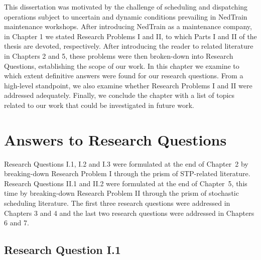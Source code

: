 	This dissertation was motivated by the challenge of scheduling and dispatching operations 
	subject to uncertain and dynamic conditions prevailing in NedTrain maintenance workshops.
	After introducing NedTrain as a maintenance company, 
	in Chapter 1 we stated Research Problems I and II, to which Parts I and II of the thesis are devoted, respectively. 
	After introducing the reader to related literature in Chapters 2 and 5, 
	these problems were then broken-down into Research Questions, 
	establishing the scope of our work. 
	In this chapter we examine to which extent definitive answers were found for our research questions. 
	From a high-level standpoint, we also examine whether Research Problems I and II were addressed adequately. 
	Finally, we conclude the chapter with a list of topics related to our work that could be investigated in future work.

\section{Answers to Research Questions}
	
	Research Questions I.1, I.2 and I.3 were formulated at the end of Chapter~2 
	by breaking-down Research Problem I through the prism of STP-related literature.
	Research Questions II.1 and II.2 were formulated at the end of Chapter~5,
	this time by breaking-down Research Problem II through the prism of stochastic scheduling literature.
	The first three research questions were addressed in Chapters 3 and 4
	and the last two research questions were addressed in Chapters 6 and 7.
	

\subsection{Research Question I.1}

